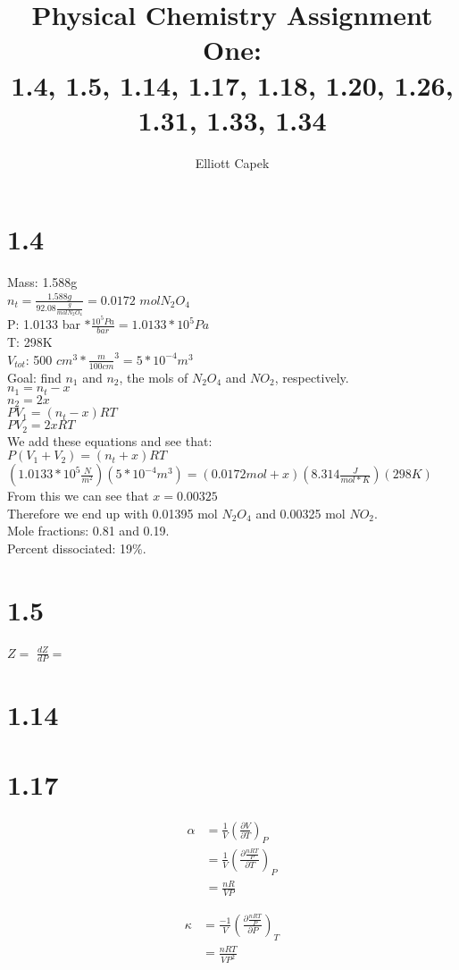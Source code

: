 \documentclass[10pt]{article} %
\title{Physical Chemistry Assignment One:\\1.4, 1.5, 1.14, 1.17, 1.18, 1.20, 1.26, 1.31, 1.33, 1.34}
\author{Elliott Capek}
\begin{document}
\maketitle{}

\section{1.4}
Mass: 1.588g\\
$n_t = \frac{1.588g}{92.08 \frac{g}{mol N_2O_4}} = 0.0172$ $ mol N_2O_4$\\
P: 1.0133 bar $* \frac{10^5 Pa}{bar} = 1.0133*10^5Pa$\\
T: 298K\\
$V_{tot}$: 500 $cm^3 * \frac{m}{100 cm}^3 = 5*10^{-4}m^3$\\

Goal: find $n_1$ and $n_2$, the mols of $N_2O_4$ and $NO_2$, respectively.\\

$n_1 = n_t-x$\\
$n_2 = 2x$\\

$PV_1 = (n_t-x)RT$\\
$PV_2 = 2xRT$\\

We add these equations and see that:\\

$P(V_1 + V_2) = (n_t+x)RT$\\
$(1.0133*10^5 \frac{N}{m^2})(5*10^{-4}m^3) = (0.0172 mol + x)(8.314 \frac{J}{mol*K})(298K)$\\

From this we can see that $x = 0.00325$\\

Therefore we end up with 0.01395 mol $N_2O_4$ and 0.00325 mol $NO_2$.\\

Mole fractions: 0.81 and 0.19.\\

Percent dissociated: 19\%.

\section{1.5}
$Z = $
$\frac{dZ}{dP} = $

\section{1.14}

\section{1.17}

\begin{align}
\alpha &= \frac{1}{V}(\frac{\partial V}{\partial T})_P\\
&= \frac{1}{V}(\frac{\partial \frac{nRT}{P}}{\partial T})_P\\
&= \frac{nR}{VP}
\end{align}

\begin{align}
\kappa &= \frac{-1}{V}(\frac{\partial \frac{nRT}{P}}{\partial P})_T\\
&= \frac{nRT}{VP^2}
\end{align}
\end{document}
